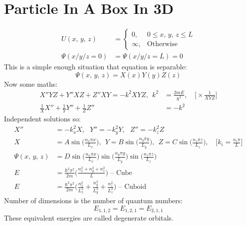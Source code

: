 \documentclass[a4paper, 11pt, normalem]{report}
\begin{document}
\section{Particle In A Box In 3D}
\begin{align}
    U(x,\,y,\,z) &=
    \begin{cases}
        0, & 0 \leq x,\,y,\,z \leq L \\
        \infty, & \text{Otherwise}
    \end{cases} \\
    \Psi(x/y/z = 0) &= \Psi(x/y/z = L) = 0
\end{align}
This is a simple enough situation that equation is separable:
\begin{equation}
    \Psi(x,\,y,\,z) = X(x)Y(y)Z(z)
\end{equation}
Now some maths:
\begin{align}
    X''YZ + Y''XZ + Z''XY = -k^{2}XYZ,~~k^{2} &= \frac{2mE}{\hbar^{2}},\quad \Big[\times \frac{1}{XYZ}\Big] \\
    \frac{1}{X}X'' + \frac{1}{Y}Y'' + \frac{1}{Z}Z'' &= -k^{2}
\end{align}
Independent solutions so:
\begin{align}
    X'' &= -k_{x}^{2}X,~~~Y'' = -k_{y}^{2}Y,~~~Z'' = -k_{z}^{2}Z \\
    X &= A\sin\bigg(\frac{n_{x}\pi x}{L_{x}}\bigg),~~Y = B\sin\bigg(\frac{n_{y}\pi y}{L_{y}}\bigg),~~Z = C\sin\bigg(\frac{n_{z}\pi z}{L_{z}}\bigg),\quad \bigg[k_{i} = \frac{n_{i}\pi}{L} \bigg] \\
    \Psi(x,\,y,\,z) &= D\sin\bigg(\frac{n_{x}\pi x}{L_{x}}\bigg)\sin\bigg(\frac{n_{y}\pi y}{L_{y}}\bigg)\sin\bigg(\frac{n_{z}\pi z}{L_{z}}\bigg) \\
    E &= \frac{\hbar^{2}\pi^{2}}{2m}\Big(\frac{n_{x}^{2} + n_{y}^{2} + n_{z}^{2}}{L}\Big)\text{ -- Cube} \\
    E &= \frac{\hbar^{2}\pi^{2}}{2m}\Big(\frac{n_{x}^{2}}{L_{x}^{2}} + \frac{n_{y}^{2}}{L_{y}^{2}} + \frac{n_{z}^{2}}{L_{z}^{2}}\Big)\text{ -- Cuboid}
\end{align}
Number of dimensions is the number of quantum numbers:
\begin{equation}
    E_{1,1,2} = E_{1,2,1} = E_{2,1,1}
\end{equation}
These equivalent energies are called degenerate orbitals.
\end{document}
